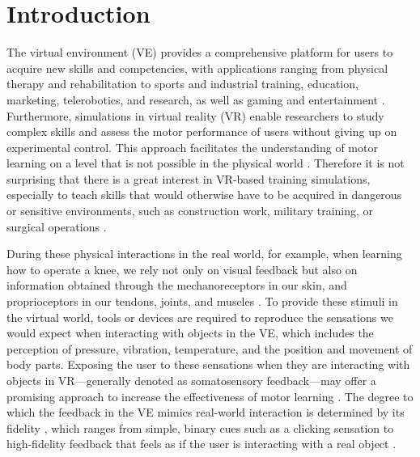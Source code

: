 
\section{Introduction}
The virtual environment (VE) provides a comprehensive platform for users to acquire new skills and competencies, with applications ranging from physical therapy and rehabilitation to sports and industrial training, education, marketing, telerobotics, and research, as well as gaming and entertainment \cite{Wu2023TrainingReality, Oagaz2022PerformanceReality}. 
Furthermore, simulations in virtual reality (VR) enable researchers to study complex skills and assess the motor performance of users without giving up on experimental control. This approach facilitates the understanding of motor learning on a level that is not possible in the physical world \cite{Harris2021ExploringSimulator, Levac2019LearningReview}. 
Therefore it is not surprising that there is a great interest in VR-based training simulations, especially to teach skills that would otherwise have to be acquired in dangerous or sensitive environments, such as construction work, military training, or surgical operations \cite{Adami2021EffectivenessTeleoperation, Lele2013VirtualUtility, Qi2021VirtualScenario}.

During these physical interactions in the real world, for example, when learning how to operate a knee, we rely not only on visual feedback but also on information obtained through the mechanoreceptors in our skin, and proprioceptors in our tendons, joints, and muscles \cite{Gonzalez-Grandon2021ProprioceptionInteraction}. To provide these stimuli in the virtual world, tools or devices are required to reproduce the sensations we would expect when interacting with objects in the VE, which includes the perception of pressure, vibration, temperature, and the position and movement of body parts. Exposing the user to these sensations when they are interacting with objects in VR---generally denoted as somatosensory feedback---may offer a promising approach to increase the effectiveness of motor learning \cite{Sigrist2013AugmentedReview}. 
The degree to which the feedback in the VE mimics real-world interaction is determined by its fidelity \cite{Caird1996PersistentTraining}, which ranges from simple, binary cues such as a clicking sensation to high-fidelity feedback that feels as if the user is interacting with a real object \cite{Yang2023}.

